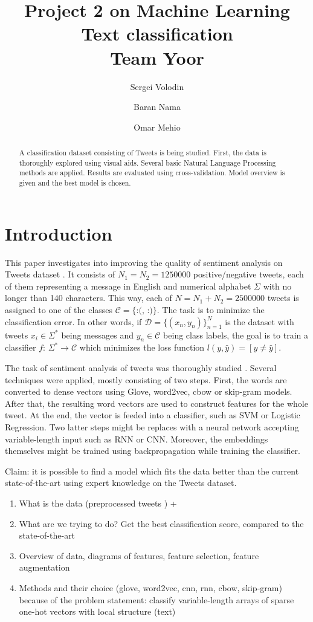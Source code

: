 \documentclass[10pt,conference,compsocconf]{IEEEtran}
\title{Project 2 on Machine Learning\\Text classification\\Team Yoor}
\author[1]{Sergei Volodin}
\author[1]{Baran Nama}
\author[1]{Omar Mehio}
\affil[1]{EPFL}
\affil[ ]{\textit {\{sergei.volodin,baran.nama,omar.mehio\}@epfl.ch}}
\begin{document}
\maketitle

\begin{abstract}
A classification dataset consisting of Tweets is being studied. First, the data is thoroughly explored using visual aids. Several basic Natural Language Processing methods are applied. Results are evaluated using cross-validation. Model overview is given and the best model is chosen.
\end{abstract}

\section{Introduction}
This paper investigates into improving the quality of sentiment analysis on Tweets dataset \cite{kaggle}.
It consists of $N_1=N_2=1250000$ positive/negative tweets, each of them representing a message in English and numerical alphabet $\Sigma$ with no longer than 140 characters.
This way, each of $N=N_1+N_2=2500000$ tweets is assigned to one of the classes $\mathcal{C}=\{\mbox{:(},\,\mbox{:)}\}$.
The task is to minimize the classification error.
In other words, if $\mathcal{D}=\{(x_n, y_n)\}_{n=1}^N$ is the dataset with tweets $x_i\in\Sigma^*$ being messages and $y_n\in \mathcal{C}$ being class labels, the goal is to train a classifier $f\colon\, \Sigma^*\to\mathcal{C}$ which minimizes the loss function $l(y,\hat{y})=[y\neq \hat{y}]$.

The task of sentiment analysis of tweets was thoroughly studied \cite{sota1, sota2}.
Several techniques were applied, mostly consisting of two steps.
First, the words are converted to dense vectors using Glove, word2vec, cbow or skip-gram models.
After that, the resulting word vectors are used to construct features for the whole tweet.
At the end, the vector is feeded into a classifier, such as SVM or Logistic Regression.
Two latter steps might be replaces with a neural network accepting variable-length input such as RNN or CNN.
Moreover, the embeddings themselves might be trained using backpropagation while training the classifier.

Claim: it is possible to find a model which fits the data better than the current state-of-the-art using expert knowledge on the Tweets dataset.
\begin{enumerate}
	\item What is the data (preprocessed tweets \cite{kaggle}) +
	\item What are we trying to do? Get the best classification score, compared to the state-of-the-art \cite{sota}
	\item Overview of data, diagrams of features, feature selection, feature augmentation
	\item Methods and their choice (glove, word2vec, cnn, rnn, cbow, skip-gram) because of the problem statement: classify variable-length arrays of sparse one-hot vectors with local structure (text)
\end{enumerate}
\end{document}
